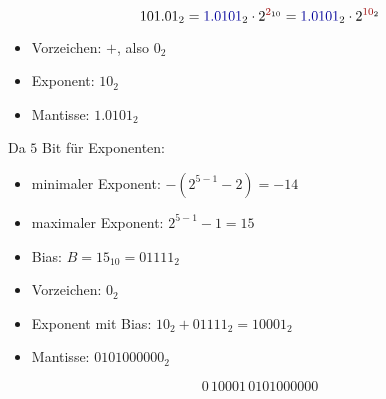 \begin{solution}
	\begin{tasks}
		\task $$101.01_2 = \textcolor{blue}{1.0101}_2 \cdot 2^{\textcolor{red}{2}_{10}} = \textcolor{blue}{1.0101}_2 \cdot 2^{\textcolor{red}{10}_2}$$
		\task \begin{itemize}
			\item Vorzeichen: $+$, also $0_2$
			\item Exponent: $10_2$
			\item Mantisse: $1.0101_2$
		\end{itemize}
		\task Da $5$ Bit für Exponenten:
		\begin{itemize}
			\item minimaler Exponent: $-(2^{5-1}-2) = -14$
			\item maximaler Exponent: $2^{5-1}-1 = 15$
			\item Bias: $B = 15_{10} = 01111_2$
		\end{itemize}
		\task \begin{itemize}
			\item Vorzeichen: $0_2$
			\item Exponent mit Bias: $10_2 + 01111_2 = 10001_2$
			\item Mantisse: $0101000000_2$
		\end{itemize}
		\task $$0\,10001\,0101000000$$
	\end{tasks}
\end{solution}

\newpage

